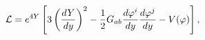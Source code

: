 \begin{equation}
{\cal L} = e ^{4 Y} \left[ 3 \left( \frac{d Y}{dy}\right)^2 
- {1\over 2} G_{ab} 
\frac{d \varphi^i}{d y} \frac{d \varphi^j}{d y}
  - V(\varphi)\right ],
\label{5dlagr}
\end{equation}

